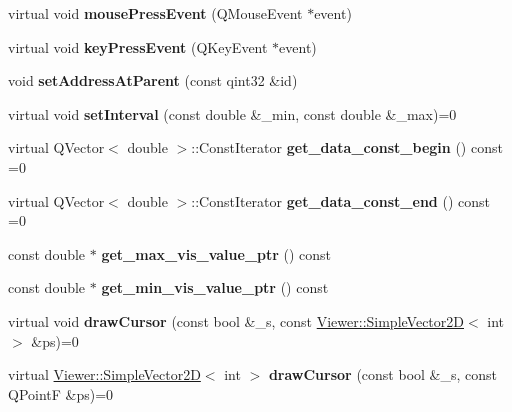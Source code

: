 \begin{DoxyCompactItemize}
virtual void {\bfseries mouse\+Press\+Event} (Q\+Mouse\+Event $\ast$event)
\item 
\mbox{\label{classdisplay__screen_aa422fde3414884615abd635e073bc737}} 
virtual void {\bfseries key\+Press\+Event} (Q\+Key\+Event $\ast$event)
\item 
\mbox{\label{classdisplay__screen_ab54ec0811e324d192a75b3e538c66513}} 
void {\bfseries set\+Address\+At\+Parent} (const qint32 \&id)
\item 
\mbox{\label{classdisplay__screen_ab2a10597339ba6fb2de1744561158391}} 
virtual void {\bfseries set\+Interval} (const double \&\+\_\+min, const double \&\+\_\+max)=0
\item 
\mbox{\label{classdisplay__screen_a59e371ef5f03f966706cf0d33331f2c6}} 
virtual Q\+Vector$<$ double $>$\+::Const\+Iterator {\bfseries get\+\_\+data\+\_\+const\+\_\+begin} () const =0
\item 
\mbox{\label{classdisplay__screen_a7746c54dcbb593f8c328d5318d686256}} 
virtual Q\+Vector$<$ double $>$\+::Const\+Iterator {\bfseries get\+\_\+data\+\_\+const\+\_\+end} () const =0
\item 
\mbox{\label{classdisplay__screen_a1a0a574c59e0c4cfd8ad8de4bb8e105d}} 
const double $\ast$ {\bfseries get\+\_\+max\+\_\+vis\+\_\+value\+\_\+ptr} () const
\item 
\mbox{\label{classdisplay__screen_a8e8a2009db3859562e3d52e44731dd03}} 
const double $\ast$ {\bfseries get\+\_\+min\+\_\+vis\+\_\+value\+\_\+ptr} () const
\item 
\mbox{\label{classdisplay__screen_ab6ae4f9a9b41b89976fc2742db40d431}} 
virtual void {\bfseries draw\+Cursor} (const bool \&\+\_\+s, const \mbox{\hyperlink{classViewer_1_1SimpleVector2D}{Viewer\+::\+Simple\+Vector2D}}$<$ int $>$ \&ps)=0
\item 
\mbox{\label{classdisplay__screen_a6fecd6139a092ed9ee2a877a9e2b2fd3}} 
virtual \mbox{\hyperlink{classViewer_1_1SimpleVector2D}{Viewer\+::\+Simple\+Vector2D}}$<$ int $>$ {\bfseries draw\+Cursor} (const bool \&\+\_\+s, const Q\+PointF \&ps)=0

\end{DoxyCompactItemize}
